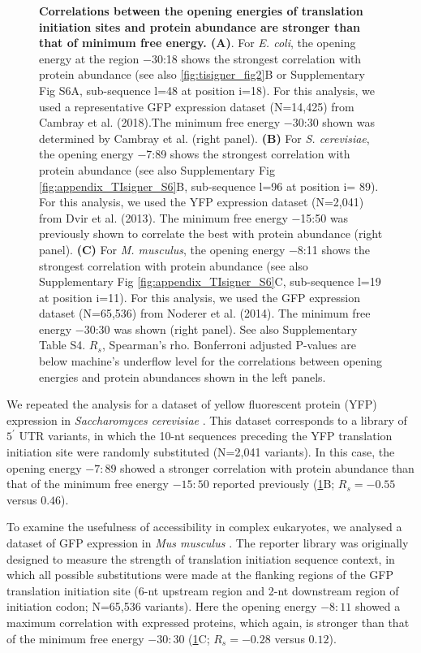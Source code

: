 \begin{figure}
	\caption[Correlations between the opening energies of translation initiation sites and protein abundance are stronger than that of minimum free energy.]{\textbf{Correlations between the opening energies of translation initiation sites and protein abundance are stronger than that of minimum free energy. (A)}. For \textit{E. coli}, the opening energy at the region −30:18 shows the strongest correlation with protein abundance (see also \ref{fig:tisigner_fig2}B or Supplementary Fig S6A, sub-sequence l=48 at position i=18). For this analysis, we used a representative GFP expression dataset (N=14,425) from Cambray et al. (2018).The minimum free energy −30:30 shown was determined by Cambray et al. (right panel). \textbf{(B)}  For \textit{S. cerevisiae}, the opening energy −7:89 shows the strongest correlation with protein abundance (see also Supplementary Fig \ref{fig:appendix_TIsigner_S6}B, sub-sequence l=96 at position i= 89). For this analysis, we used the YFP expression dataset (N=2,041) from Dvir et al. (2013). The minimum free energy −15:50 was previously shown to correlate the best with protein abundance (right panel). \textbf{(C)} For \textit{M. musculus}, the opening energy −8:11 shows the strongest correlation with protein abundance (see also Supplementary Fig \ref{fig:appendix_TIsigner_S6}C, sub-sequence l=19 at position i=11). For this analysis, we used the GFP expression dataset (N=65,536) from Noderer et al. (2014). The minimum free energy −30:30 was shown (right panel). See also Supplementary Table S4. $R_s$, Spearman’s rho. Bonferroni adjusted P-values are below machine’s underflow level for the correlations between opening energies and protein abundances shown in the left panels.}
	\label{fig:tisigner_fig1}
\end{figure}


We repeated the analysis for a dataset of yellow fluorescent protein (YFP) expression in \textit{Saccharomyces cerevisiae} \cite{Dvir2013-lq}. This dataset corresponds to a library of $5^{\prime}$ UTR variants, in which the 10-nt sequences preceding the YFP translation initiation site were randomly substituted (N=2,041 variants). In this case, the opening energy $−7:89$ showed a stronger correlation with protein abundance than that of the minimum free energy $−15:50$ reported previously (\ref{fig:tisigner_fig1}B; $R_s=−0.55$ versus $0.46$).

To examine the usefulness of accessibility in complex eukaryotes, we analysed a dataset of GFP expression in \textit{Mus musculus} \cite{Noderer2014-ve}. The reporter library was originally designed to measure the strength of translation initiation sequence context, in which all possible substitutions were made at the flanking regions of the GFP translation initiation site (6-nt upstream region and 2-nt downstream region of initiation codon; N=65,536 variants). Here the opening energy $−8:11$ showed a maximum correlation with expressed proteins, which again, is stronger than that of the minimum free energy $−30:30$ (\ref{fig:tisigner_fig1}C; $R_s=−0.28$ versus $0.12$). 

